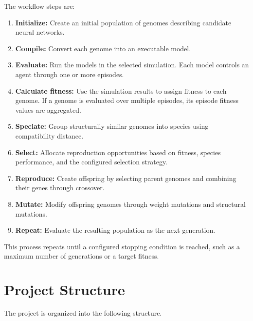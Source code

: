 \documentclass[11pt]{article}
\begin{document}
The workflow steps are:

\begin{enumerate}
    \item \textbf{Initialize:} Create an initial population of genomes
    describing candidate neural networks.

    \item \textbf{Compile:} Convert each genome into an executable model.

    \item \textbf{Evaluate:} Run the models in the selected simulation.
    Each model controls an agent through one or more episodes.

    \item \textbf{Calculate fitness:} Use the simulation results to
    assign fitness to each genome. If a genome is evaluated over multiple
    episodes, its episode fitness values are aggregated.

    \item \textbf{Speciate:} Group structurally similar genomes into
    species using compatibility distance.

    \item \textbf{Select:} Allocate reproduction opportunities based
    on fitness, species performance, and the configured selection
    strategy.

    \item \textbf{Reproduce:} Create offspring by selecting parent
    genomes and combining their genes through crossover.

    \item \textbf{Mutate:} Modify offspring genomes through weight
    mutations and structural mutations.

    \item \textbf{Repeat:} Evaluate the resulting population as the
    next generation.
\end{enumerate}

This process repeats until a configured stopping condition is reached,
such as a maximum number of generations or a target fitness.

\section{Project Structure}

The project is organized into the following structure.
\end{document}
